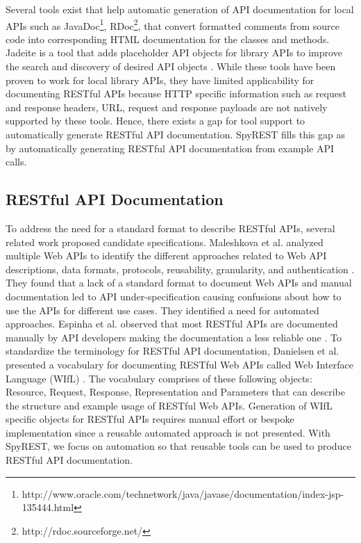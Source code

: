 \documentclass[conference]{IEEEtran}
\begin{document}
Several tools exist that help automatic generation of API documentation for local APIs such as JavaDoc\footnote{http://www.oracle.com/technetwork/java/javase/documentation/index-jsp-135444.html}, RDoc\footnote{http://rdoc.sourceforge.net/}, that convert formatted comments from source code into corresponding HTML documentation for the classes and methods. Jadeite is a tool that adds placeholder API objects for library APIs to improve the search and discovery of desired API objects \cite{Jadeite}. While these tools have been proven to work for local library APIs, they have limited applicability for documenting RESTful APIs because HTTP specific information such as request and response headers, URL, request and response payloads are not natively supported by these tools. Hence, there exists a gap for tool support to automatically generate RESTful API documentation. SpyREST fills this gap as by automatically generating RESTful API documentation from example API calls.

\subsection{RESTful API Documentation} %
\label{sub:restful_api_documentation}

To address the need for a standard format to describe RESTful APIs, several related work proposed candidate specifications. Maleshkova et al. analyzed multiple Web APIs to identify the different approaches related to Web API descriptions, data formats, protocols, reusability, granularity, and authentication \cite{Maleshkova_investigating}. They found that a lack of a standard format to document Web APIs and manual documentation led to API under-specification causing confusions about how to use the APIs for different use cases. They identified a need for automated approaches. Espinha et al. observed that most RESTful APIs are documented manually by API developers making the documentation a less reliable one \cite{Espinha_web}. To standardize the terminology for RESTful API documentation, Danielsen et al. presented a vocabulary for documenting RESTful Web APIs called Web Interface Language (WIfL) \cite{Danielsen_validation}. The vocabulary comprises of these following objects: Resource, Request, Response, Representation and Parameters that can describe the structure and example usage of RESTful Web APIs. Generation of WIfL specific objects for RESTful APIs requires manual effort or bespoke implementation since a reusable automated approach is not presented. With SpyREST, we focus on automation so that reusable tools can be used to produce RESTful API documentation.
\end{document}
